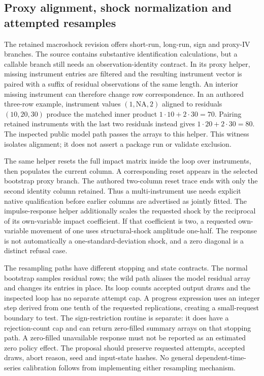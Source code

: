 \subsection{Proxy alignment, shock normalization and attempted resamples}

The retained macroshock revision offers short-run, long-run, sign and proxy-IV branches. The source contains substantive identification calculations, but a callable branch still needs an observation-identity contract. In its proxy helper, missing instrument entries are filtered and the resulting instrument vector is paired with a suffix of residual observations of the same length. An interior missing instrument can therefore change row correspondence. In an authored three-row example, instrument values $(1,\mathrm{NA},2)$ aligned to residuals $(10,20,30)$ produce the matched inner product $1\cdot10+2\cdot30=70$. Pairing retained instruments with the last two residuals instead gives $1\cdot20+2\cdot30=80$. The inspected public model path passes the arrays to this helper. This witness isolates alignment; it does not assert a package run or validate exclusion.\citep{exec25_pydyn_macroshock,exec25_pydyn_choice}

The same helper resets the full impact matrix inside the loop over instruments, then populates the current column. A corresponding reset appears in the selected bootstrap proxy branch. The authored two-column reset trace ends with only the second identity column retained. Thus a multi-instrument use needs explicit native qualification before earlier columns are advertised as jointly fitted. The impulse-response helper additionally scales the requested shock by the reciprocal of its own-variable impact coefficient. If that coefficient is two, a requested own-variable movement of one uses structural-shock amplitude one-half. The response is not automatically a one-standard-deviation shock, and a zero diagonal is a distinct refusal case.\citep{exec25_pydyn_macroshock,exec25_pydyn_choice}

The resampling paths have different stopping and state contracts. The normal bootstrap samples residual rows; the wild path aliases the model residual array and changes its entries in place. Its loop counts accepted output draws and the inspected loop has no separate attempt cap. A progress expression uses an integer step derived from one tenth of the requested replications, creating a small-request boundary to test. The sign-restriction routine is separate: it does have a rejection-count cap and can return zero-filled summary arrays on that stopping path. A zero-filled unavailable response must not be reported as an estimated zero policy effect. The proposal should preserve requested attempts, accepted draws, abort reason, seed and input-state hashes. No general dependent-time-series calibration follows from implementing either resampling mechanism.\citep{exec25_pydyn_macroshock}

